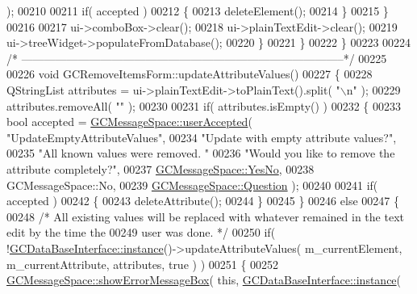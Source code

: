 \begin{DoxyCode}
{      );
00210 
00211         \textcolor{keywordflow}{if}( accepted )
00212         \{
00213           deleteElement();
00214         \}
00215       \}
00216 
00217       ui->comboBox->clear();
00218       ui->plainTextEdit->clear();
00219       ui->treeWidget->populateFromDatabase();
00220     \}
00221   \}
00222 \}
00223 
00224 \textcolor{comment}{/*
      --------------------------------------------------------------------------------------*/}
00225 
00226 \textcolor{keywordtype}{void} GCRemoveItemsForm::updateAttributeValues()
00227 \{
00228   QStringList attributes = ui->plainTextEdit->toPlainText().split( \textcolor{stringliteral}{"\(\backslash\)n"} );
00229   attributes.removeAll( \textcolor{stringliteral}{""} );
00230 
00231   \textcolor{keywordflow}{if}( attributes.isEmpty() )
00232   \{
00233     \textcolor{keywordtype}{bool} accepted = \hyperlink{namespace_g_c_message_space_ae6f97d25f38a6b35c49e6e67ce4afaca}{GCMessageSpace::userAccepted}( \textcolor{stringliteral}{"UpdateEmptyAttributeValues"},
00234                                                   \textcolor{stringliteral}{"Update with empty attribute
       values?"},
00235                                                   \textcolor{stringliteral}{"All known values were
       removed. "}
00236                                                   \textcolor{stringliteral}{"Would you like to remove the
       attribute completely?"},
00237                                                   \hyperlink{namespace_g_c_message_space_ac1db082c29062fe6508ba03bf76bea44ab2defe87f3e886edf34f537f4ac8c282}{GCMessageSpace::YesNo},
00238                                                   GCMessageSpace::No,
00239                                                   \hyperlink{namespace_g_c_message_space_a67e94586e09cbc305257fbcdd7b686e2ae66d6709c87ccb0832b1456e2b4ad895}{GCMessageSpace::Question} );
00240 
00241     \textcolor{keywordflow}{if}( accepted )
00242     \{
00243       deleteAttribute();
00244     \}
00245   \}
00246   \textcolor{keywordflow}{else}
00247   \{
00248     \textcolor{comment}{/* All existing values will be replaced with whatever remained in the text
       edit by the time the}
00249 \textcolor{comment}{      user was done. */}
00250     \textcolor{keywordflow}{if}( !\hyperlink{class_g_c_data_base_interface_a1baea9c0667aa8b610ec30076fcab84c}{GCDataBaseInterface::instance}()->updateAttributeValues( 
      m\_currentElement, m\_currentAttribute, attributes, \textcolor{keyword}{true} ) )
00251     \{
00252       \hyperlink{namespace_g_c_message_space_ab118b3a133686167617eb955029fd44e}{GCMessageSpace::showErrorMessageBox}( \textcolor{keyword}{this}, \hyperlink{class_g_c_data_base_interface_a1baea9c0667aa8b610ec30076fcab84c}{GCDataBaseInterface::instance}(
}
\end{DoxyCode}
